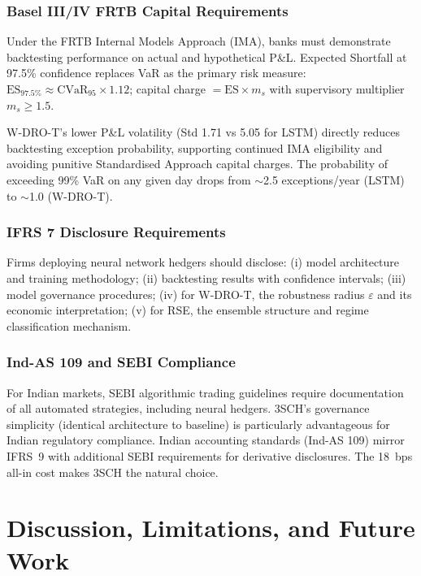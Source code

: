 \subsubsection{Basel III/IV FRTB Capital Requirements}

Under the FRTB Internal Models Approach (IMA), banks must demonstrate backtesting performance on actual and hypothetical P\&L. Expected Shortfall at 97.5\% confidence replaces VaR as the primary risk measure: $\mathrm{ES}_{97.5\%} \approx \mathrm{CVaR}_{95} \times 1.12$; capital charge $= \mathrm{ES} \times m_s$ with supervisory multiplier $m_s \geq 1.5$.

W-DRO-T's lower P\&L volatility (Std 1.71 vs 5.05 for LSTM) directly reduces backtesting exception probability, supporting continued IMA eligibility and avoiding punitive Standardised Approach capital charges. The probability of exceeding 99\% VaR on any given day drops from $\sim$2.5 exceptions/year (LSTM) to $\sim$1.0 (W-DRO-T).

\subsubsection{IFRS 7 Disclosure Requirements}

Firms deploying neural network hedgers should disclose: (i) model architecture and training methodology; (ii) backtesting results with confidence intervals; (iii) model governance procedures; (iv) for W-DRO-T, the robustness radius $\varepsilon$ and its economic interpretation; (v) for RSE, the ensemble structure and regime classification mechanism.

\subsubsection{Ind-AS 109 and SEBI Compliance}

For Indian markets, SEBI algorithmic trading guidelines require documentation of all automated strategies, including neural hedgers. 3SCH's governance simplicity (identical architecture to baseline) is particularly advantageous for Indian regulatory compliance. Indian accounting standards (Ind-AS 109) mirror IFRS~9 with additional SEBI requirements for derivative disclosures. The 18~bps all-in cost makes 3SCH the natural choice.

\section{Discussion, Limitations, and Future Work}
\label{sec:discussion}

